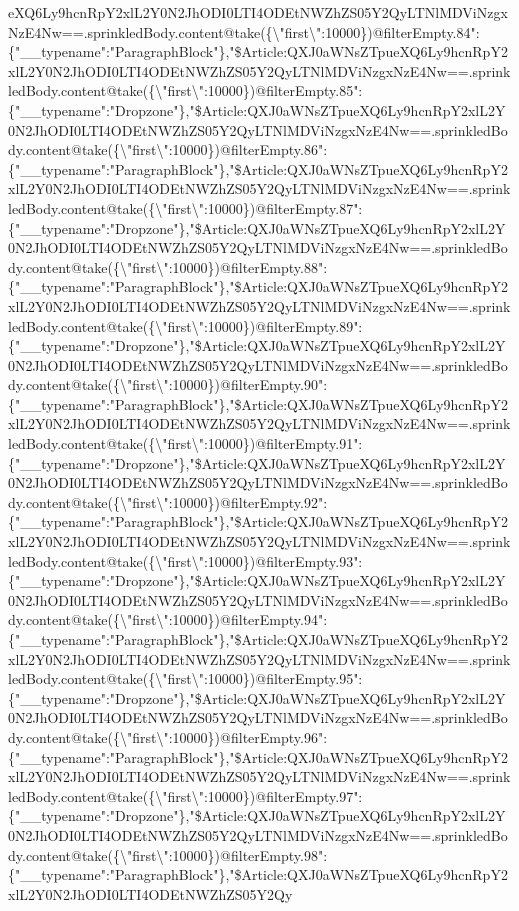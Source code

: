 eXQ6Ly9hcnRpY2xlL2Y0N2JhODI0LTI4ODEtNWZhZS05Y2QyLTNlMDViNzgxNzE4Nw==.sprinkledBody.content@take(\{\textbackslash{}"first\textbackslash{}":10000\})@filterEmpty.84":\{"\_\_typename":"ParagraphBlock"\},"\$Article:QXJ0aWNsZTpueXQ6Ly9hcnRpY2xlL2Y0N2JhODI0LTI4ODEtNWZhZS05Y2QyLTNlMDViNzgxNzE4Nw==.sprinkledBody.content@take(\{\textbackslash{}"first\textbackslash{}":10000\})@filterEmpty.85":\{"\_\_typename":"Dropzone"\},"\$Article:QXJ0aWNsZTpueXQ6Ly9hcnRpY2xlL2Y0N2JhODI0LTI4ODEtNWZhZS05Y2QyLTNlMDViNzgxNzE4Nw==.sprinkledBody.content@take(\{\textbackslash{}"first\textbackslash{}":10000\})@filterEmpty.86":\{"\_\_typename":"ParagraphBlock"\},"\$Article:QXJ0aWNsZTpueXQ6Ly9hcnRpY2xlL2Y0N2JhODI0LTI4ODEtNWZhZS05Y2QyLTNlMDViNzgxNzE4Nw==.sprinkledBody.content@take(\{\textbackslash{}"first\textbackslash{}":10000\})@filterEmpty.87":\{"\_\_typename":"Dropzone"\},"\$Article:QXJ0aWNsZTpueXQ6Ly9hcnRpY2xlL2Y0N2JhODI0LTI4ODEtNWZhZS05Y2QyLTNlMDViNzgxNzE4Nw==.sprinkledBody.content@take(\{\textbackslash{}"first\textbackslash{}":10000\})@filterEmpty.88":\{"\_\_typename":"ParagraphBlock"\},"\$Article:QXJ0aWNsZTpueXQ6Ly9hcnRpY2xlL2Y0N2JhODI0LTI4ODEtNWZhZS05Y2QyLTNlMDViNzgxNzE4Nw==.sprinkledBody.content@take(\{\textbackslash{}"first\textbackslash{}":10000\})@filterEmpty.89":\{"\_\_typename":"Dropzone"\},"\$Article:QXJ0aWNsZTpueXQ6Ly9hcnRpY2xlL2Y0N2JhODI0LTI4ODEtNWZhZS05Y2QyLTNlMDViNzgxNzE4Nw==.sprinkledBody.content@take(\{\textbackslash{}"first\textbackslash{}":10000\})@filterEmpty.90":\{"\_\_typename":"ParagraphBlock"\},"\$Article:QXJ0aWNsZTpueXQ6Ly9hcnRpY2xlL2Y0N2JhODI0LTI4ODEtNWZhZS05Y2QyLTNlMDViNzgxNzE4Nw==.sprinkledBody.content@take(\{\textbackslash{}"first\textbackslash{}":10000\})@filterEmpty.91":\{"\_\_typename":"Dropzone"\},"\$Article:QXJ0aWNsZTpueXQ6Ly9hcnRpY2xlL2Y0N2JhODI0LTI4ODEtNWZhZS05Y2QyLTNlMDViNzgxNzE4Nw==.sprinkledBody.content@take(\{\textbackslash{}"first\textbackslash{}":10000\})@filterEmpty.92":\{"\_\_typename":"ParagraphBlock"\},"\$Article:QXJ0aWNsZTpueXQ6Ly9hcnRpY2xlL2Y0N2JhODI0LTI4ODEtNWZhZS05Y2QyLTNlMDViNzgxNzE4Nw==.sprinkledBody.content@take(\{\textbackslash{}"first\textbackslash{}":10000\})@filterEmpty.93":\{"\_\_typename":"Dropzone"\},"\$Article:QXJ0aWNsZTpueXQ6Ly9hcnRpY2xlL2Y0N2JhODI0LTI4ODEtNWZhZS05Y2QyLTNlMDViNzgxNzE4Nw==.sprinkledBody.content@take(\{\textbackslash{}"first\textbackslash{}":10000\})@filterEmpty.94":\{"\_\_typename":"ParagraphBlock"\},"\$Article:QXJ0aWNsZTpueXQ6Ly9hcnRpY2xlL2Y0N2JhODI0LTI4ODEtNWZhZS05Y2QyLTNlMDViNzgxNzE4Nw==.sprinkledBody.content@take(\{\textbackslash{}"first\textbackslash{}":10000\})@filterEmpty.95":\{"\_\_typename":"Dropzone"\},"\$Article:QXJ0aWNsZTpueXQ6Ly9hcnRpY2xlL2Y0N2JhODI0LTI4ODEtNWZhZS05Y2QyLTNlMDViNzgxNzE4Nw==.sprinkledBody.content@take(\{\textbackslash{}"first\textbackslash{}":10000\})@filterEmpty.96":\{"\_\_typename":"ParagraphBlock"\},"\$Article:QXJ0aWNsZTpueXQ6Ly9hcnRpY2xlL2Y0N2JhODI0LTI4ODEtNWZhZS05Y2QyLTNlMDViNzgxNzE4Nw==.sprinkledBody.content@take(\{\textbackslash{}"first\textbackslash{}":10000\})@filterEmpty.97":\{"\_\_typename":"Dropzone"\},"\$Article:QXJ0aWNsZTpueXQ6Ly9hcnRpY2xlL2Y0N2JhODI0LTI4ODEtNWZhZS05Y2QyLTNlMDViNzgxNzE4Nw==.sprinkledBody.content@take(\{\textbackslash{}"first\textbackslash{}":10000\})@filterEmpty.98":\{"\_\_typename":"ParagraphBlock"\},"\$Article:QXJ0aWNsZTpueXQ6Ly9hcnRpY2xlL2Y0N2JhODI0LTI4ODEtNWZhZS05Y2Qy